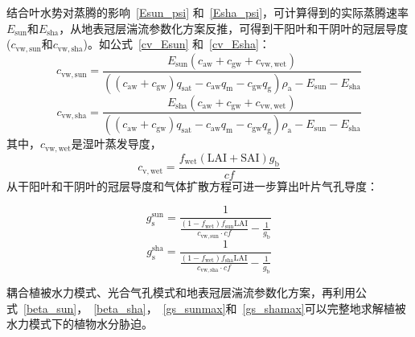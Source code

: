 结合叶水势对蒸腾的影响~\eqref{Esun_psi} 和~\eqref{Esha_psi}，可计算得到的实际蒸腾速率$E_{\mathrm{sun}}$和$E_{\mathrm{sha}}$，从地表冠层湍流参数化方案反推，可得到干阳叶和干阴叶的冠层导度 ($c_{\mathrm{vw,sun}}$和$c_{\mathrm{vw,sha}}$)。如公式~\eqref{cv_Esun} 和~\eqref{cv_Esha}：
\begin{equation}\label{cv_Esun}c_{\mathrm{vw,sun}}=\frac{E_{\mathrm{sun}}\left(c_{\mathrm {aw}}+c_{\mathrm {gw}}+c_{\mathrm{vw,wet}}\right)}{\left(\left(c_{\mathrm {aw}}+c_{\mathrm {gw}}\right)q_{\mathrm{sat}}-c_{\mathrm {aw}} q_{\mathrm {m}} - c_{\mathrm {gw}} q_{\mathrm {g}}\right)\rho_{\mathrm{a}}-E_{\mathrm{sun}}-E_{\mathrm{sha}}}
\end{equation}
%
\begin{equation}\label{cv_Esha}
  c_{\mathrm{vw,sha}}=\frac{E_{\mathrm{sha}}\left(c_{\mathrm {aw}}+c_{\mathrm {gw}}+c_{\mathrm{vw,wet}}\right)}{\left(\left(c_{\mathrm {aw}}+c_{\mathrm {gw}}\right)q_{\mathrm{sat}}-c_{\mathrm {aw}} q_{\mathrm {m}} - c_{\mathrm {gw}} q_{\mathrm {g}}\right)\rho_{\mathrm{a}}-E_{\mathrm{sun}}-E_{\mathrm{sha}}}
\end{equation}
其中，$c_{\mathrm{vw,wet}}$是湿叶蒸发导度，
\begin{equation}\label{cwet}
  c_{\mathrm{v,wet}}=\frac{f_{\mathrm{wet}}\left(\text{LAI}+\text{SAI}\right)g_{\mathrm {b}}}{cf}
\end{equation}
从干阳叶和干阴叶的冠层导度和气体扩散方程可进一步算出叶片气孔导度：

\begin{equation}\label{gssun_cvsun}
  g_{\mathrm{s}}^{\mathrm {sun}} = \frac{1}{\frac{(1-f_{\mathrm{wet}})f_{\mathrm{sun}}\text{LAI}}{c_{\mathrm{vw,sun}}\cdot cf}-\frac{1}{g_{\mathrm {b}}}}
\end{equation}
\begin{equation}\label{gssun_cvsha}
  g_{\mathrm{s}}^{\mathrm {sha}} = \frac{1}{\frac{(1-f_{\mathrm{wet}})f_{\mathrm{sha}}\text{LAI}}{c_{\mathrm{vw,sha}}\cdot cf}-\frac{1}{g_{\mathrm {b}}}}
\end{equation}


耦合植被水力模式、光合气孔模式和地表冠层湍流参数化方案，再利用公式~\eqref{beta_sun}，~\eqref{beta_sha}，~\eqref{gs_sunmax}和~\eqref{gs_shamax}可以完整地求解植被水力模式下的植物水分胁迫。


